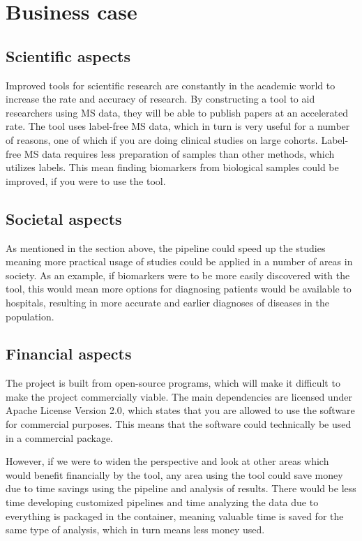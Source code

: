 \section{Business case}

\subsection{Scientific aspects}

Improved tools for scientific research are constantly in the academic world to increase the rate and accuracy of research. By constructing a tool to aid researchers using MS data, they will be able to publish papers at an accelerated rate. The tool uses label-free MS data, which in turn is very useful for a number of reasons, one of which if you are doing clinical studies on large cohorts. Label-free MS data requires less preparation of samples than other methods, which utilizes labels. This mean finding biomarkers from biological samples could be improved, if you were to use the tool.

\subsection{Societal aspects}

As mentioned in the section above, the pipeline could speed up the studies meaning more practical usage of studies could be applied in a number of areas in society. As an example, if biomarkers were to be more easily discovered with the tool, this would mean more options for diagnosing patients would be available to hospitals, resulting in more accurate and earlier diagnoses of diseases in the population.

\subsection{Financial aspects}

The project is built from open-source programs, which will make it difficult to make the project commercially viable. The main dependencies are licensed under Apache License Version 2.0, which states that you are allowed to use the software for commercial purposes. This means that the software could technically be used in a commercial package.

However, if we were to widen the perspective and look at other areas which would benefit financially by the tool, any area using the tool could save money due to time savings using the pipeline and analysis of results. There would be less time developing customized pipelines and time analyzing the data due to everything is packaged in the container, meaning valuable time is saved for the same type of analysis, which in turn means less money used.
